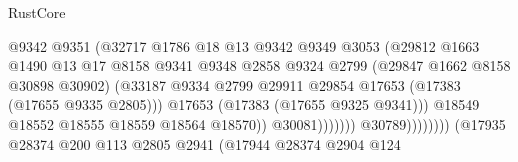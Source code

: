\begin{lexlean}{RustCore}
\begin{coremodule}
                                                  @9342
                                                  @9351
                                                  (@32717
                                                    @1786
                                                    @18
                                                    @13
                                                    @9342
                                                    @9349
                                                    @3053
                                                    (@29812
                                                      @1663
                                                      @1490
                                                      @13
                                                      @17
                                                      @8158
                                                      @9341
                                                      @9348
                                                      @2858
                                                      @9324
                                                      @2799
                                                      (@29847 @1662 @8158 @30898 @30902)
                                                      (@33187
                                                        @9334
                                                        @2799
                                                        @29911
                                                        @29854
                                                        @17653
                                                        (@17383 (@17655 @9335 @2805)))
                                                      @17653
                                                      (@17383 (@17655 @9325 @9341)))
                                                    @18549
                                                    @18552
                                                    @18555
                                                    @18559
                                                    @18564
                                                    @18570))
                                                @30081)))))))
                                  @30789))))))))
                  (@17935
                    @28374
                    @200
                    @113
                    @2805
                    @2941
                    (@17944
                      @28374
                      @2904
                      @124

\end{coremodule}
\end{lexlean}
